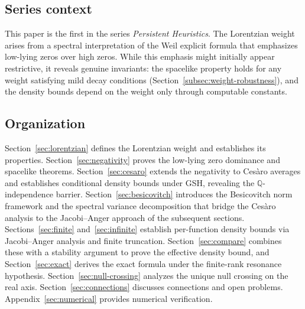 \documentclass[12pt,reqno]{amsart}
\theoremstyle{plain}
\theoremstyle{definition}
\theoremstyle{remark}
\newcommand{\Q}{\mathbb{Q}}
\begin{document}
\subsection{Series context}

This paper is the first in the series \emph{Persistent Heuristics}.  The Lorentzian weight arises from a spectral interpretation of the Weil explicit formula that emphasizes low-lying zeros over high zeros.  While this emphasis might initially appear restrictive, it reveals genuine invariants: the spacelike property holds for any weight satisfying mild decay conditions (Section~\ref{subsec:weight-robustness}), and the density bounds depend on the weight only through computable constants.

\subsection{Organization}

Section~\ref{sec:lorentzian} defines the Lorentzian weight and establishes its properties. Section~\ref{sec:negativity} proves the low-lying zero dominance and spacelike theorems. Section~\ref{sec:cesaro} extends the negativity to Ces\`aro averages and establishes conditional density bounds under GSH, revealing the $\Q$-independence barrier. Section~\ref{sec:besicovitch} introduces the Besicovitch norm framework and the spectral variance decomposition that bridge the Ces\`aro analysis to the Jacobi--Anger approach of the subsequent sections. Sections~\ref{sec:finite} and~\ref{sec:infinite} establish per-function density bounds via Jacobi--Anger analysis and finite truncation. Section~\ref{sec:compare} combines these with a stability argument to prove the effective density bound, and Section~\ref{sec:exact} derives the exact formula under the finite-rank resonance hypothesis. Section~\ref{sec:null-crossing} analyzes the unique null crossing on the real axis. Section~\ref{sec:connections} discusses connections and open problems. Appendix~\ref{sec:numerical} provides numerical verification.
\end{document}

